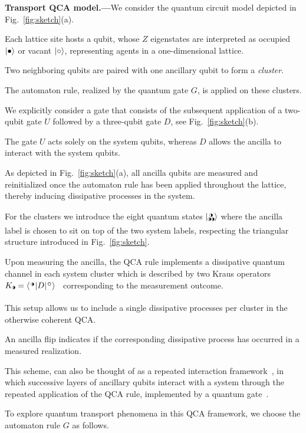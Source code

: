 \documentclass[aps,prl,twocolumn,groupedaddress,superscriptaddress,colorlinks,bookmarks=false,citecolor=darkspringgreen,linkcolor=darkolivegreen,urlcolor=navyblue]{revtex4-1}
\newcommand{\threestate}[3]{
\begin{matrix}
#1\\[-.25cm]
#2#3
\end{matrix}
}
\newcommand{\kett}[1]{\lvert #1 \rangle}
\newcommand{\brat}[1]{\langle #1 \rvert}
\newcommand{\halfcirc}{
  \mathbin{
    \tikz[baseline=-0.5ex]{
      \draw[line width=0.07ex] (0,0) circle (0.42ex);
      \fill (0,-0.42ex) arc (-90:90:0.42ex) -- cycle;
    }
  }
}
\begin{document}
{\bf Transport QCA model.---}We consider the quantum circuit model depicted in Fig.~\ref{fig:sketch}(a).

Each lattice site hosts a qubit, whose $Z$ eigenstates are interpreted as occupied $\ket{\bullet}$ or vacant $\ket{\circ}$, representing agents in a one-dimensional lattice.

Two neighboring qubits are paired with one ancillary qubit to form a {\it cluster}.

The automaton rule, realized by the quantum gate $G$, is applied on these clusters.

We explicitly consider a gate that consists of the subsequent application of a two-qubit gate $U$ followed by a three-qubit gate $D$, see Fig.~\ref{fig:sketch}(b).

The gate $U$ acts solely on the system qubits, whereas $D$ allows the ancilla to interact with the system qubits.

As depicted in Fig.~\ref{fig:sketch}(a), all ancilla qubits are measured and reinitialized once the automaton rule has been applied throughout the lattice, thereby inducing dissipative processes in the system.

For the clusters we introduce the eight quantum states $\kett{\threestate{\halfcirc}{\halfcirc}{\halfcirc}}$ where the ancilla label is chosen to sit on top of the two system labels, respecting the triangular structure introduced in Fig.~\ref{fig:sketch}.

Upon measuring the ancilla, the QCA rule implements a dissipative quantum channel in each system cluster which is described by two Kraus operators $K_{\halfcirc} = \brat{\threestate{\halfcirc}{\ }{\ }} D \kett{\threestate{\circ}{\ }{\ }}$~\cite{SM} corresponding to the measurement outcome.

This setup allows us to include a single dissipative processes per cluster in the otherwise coherent QCA.

An ancilla flip indicates if the corresponding dissipative process has occurred in a measured realization.

This scheme, can also be thought of as a repeated interaction framework~\cite{Karevski09}, in which successive layers of ancillary qubits interact with a system through the repeated application of the QCA rule, implemented by a quantum gate~\cite{Gill20,Gill21,Gill22,Gill23,Boneberg_2023}.

To explore quantum transport phenomena in this QCA framework, we choose the automaton rule $G$ as follows.
\end{document}
